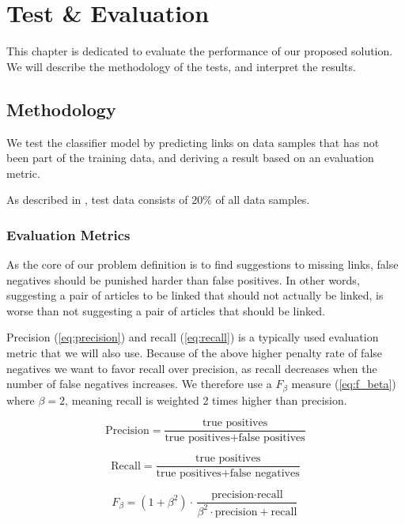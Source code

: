 \chapter{Test \& Evaluation}\label{chap:testeval}
This chapter is dedicated to evaluate the performance of our proposed solution. We will describe the methodology of the tests, and interpret the results.

\section{Methodology}
We test the classifier model by predicting links on data samples that has not been part of the training data, and deriving a result based on an evaluation metric.

As described in , test data consists of 20\% of all data samples. 

\subsection{Evaluation Metrics}
As the core of our problem definition is to find suggestions to missing links, false negatives should be punished harder than false positives. In other words, suggesting a pair of articles to be linked that should not actually be linked, is worse than not suggesting a pair of articles that should be linked. 

Precision (\cref{eq:precision}) and recall (\cref{eq:recall}) is a typically used evaluation metric that we will also use. Because of the above higher penalty rate of false negatives we want to favor recall over precision, as recall decreases when the number of false negatives increases. We therefore use a $F_\beta$ measure (\cref{eq:f_beta}) where $\beta = 2$, meaning recall is weighted 2 times higher than precision. 

\begin{equation}\label{eq:precision}
\text{Precision} = \frac{\text{true positives}}{\text{true positives} + \text{false positives}}
\end{equation}

\begin{equation}\label{eq:recall}
\text{Recall} = \frac{\text{true positives}}{\text{true positives} + \text{false negatives}}
\end{equation}

\begin{equation}\label{eq:f_beta}
F_\beta = (1+ \beta^2 ) \cdot \frac{ \text{precision} \cdot \text{recall} }{ \beta^2 \cdot \text{precision} + \text{recall} }
\end{equation}

